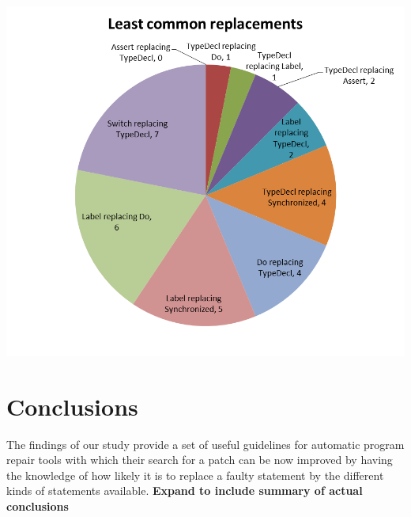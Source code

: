 \documentclass{sig-alternate-05-2015}
\newcommand{\todo}[1]
  {{\scriptsize \textbf{\color{red} {#1}}}}
\begin{document}
\includegraphics[scale=0.5]{g2.png}





\section{Conclusions}
The findings of our study provide a set of useful guidelines for automatic
program repair tools with which their search for a patch can be now improved by
having the knowledge of how likely it is to replace a faulty statement by the
different kinds of statements available.
\todo{Expand to include summary of actual conclusions}




%

%
%


\end{document}
